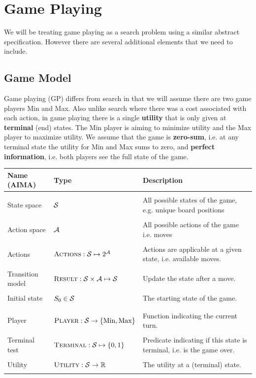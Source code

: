 \documentclass[11pt]{article}
\begin{document}
\section{Game Playing}

We will be treating game playing as a search problem using a similar abstract specification. However there are several additional elements that we need to include.

\subsection{Game Model}

Game playing (GP) differs from search in that we will assume there are two game players Min and Max. Also unlike search where there was a cost associated with each action, in game playing there is a single \textbf{utility} that is only given at \textbf{terminal} (end) states. The Min player is aiming to minimize utility and the Max player to maximize utility. We assume that the game is \textbf{zero-sum}, i.e. at any terminal state the utility for Min and Max sums to zero, and \textbf{perfect information}, i.e. both players see the full state of the game.

 \air
\begin{center}
\begin{tabularx}{\linewidth}{llX}
  \toprule
  Name (AIMA) & Type & Description \\
  \midrule
\\
 State space & $\mathcal{S}$ & All possible states of the game, e.g. unique board positions \\\\
 Action space & $\mathcal{A}$& All possible actions of the game i.e. moves\\\\
 Actions&  $\mathrm{\textsc{Actions}}: \mathcal{S} \mapsto 2^{\mathcal{A}}$ & Actions are applicable at a given state, i.e. available moves. \\\\
 Transition model&  $\mathrm{\textsc{Result}}:  \mathcal{S} \times \mathcal{A} \mapsto \mathcal{S} $ &  Update the state after a move.  \\\\
 Initial state &  $S_0 \in \mathcal{S}$ & The starting state of the game.  \\\\
 \midrule \\
 Player& $\mathrm{\textsc{Player}}: \mathcal{S} \rightarrow \{\mathrm{Min}, \mathrm{Max}\}$ & Function indicating the current turn. \\\\
 Terminal test& $\mathrm{\textsc{Terminal}}: \mathcal{S} \mapsto \{0, 1\} $ & Predicate indicating if this state is terminal, i.e. is the game over. \\\\
 Utility & $\mathrm{\textsc{Utility}}: \mathcal{S} \rightarrow \mathbb{R}$ & The utility at a (terminal) state. \\\\
 \bottomrule
\end{tabularx}
\end{center}
\end{document}

